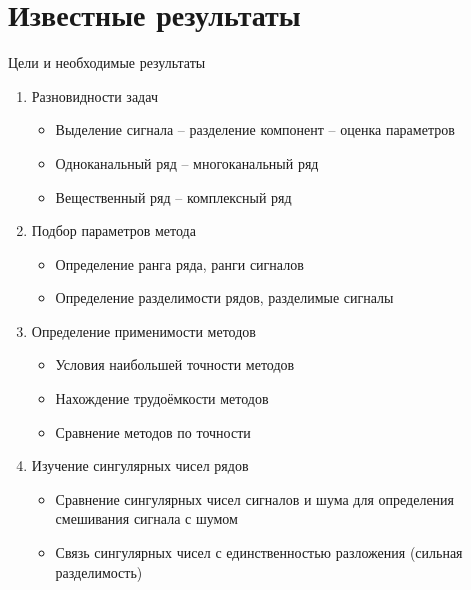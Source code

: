 \documentclass[pdf, unicode, 10pt, notheorems, handout]{beamer}
\begin{document}
\section{Известные результаты}
\begin{frame}{Цели и необходимые результаты}
  \begin{enumerate}
    \item Разновидности задач
      \begin{itemize}
        \item Выделение сигнала -- разделение компонент -- оценка параметров
        \item Одноканальный ряд -- многоканальный ряд
        \item Вещественный ряд -- комплексный ряд
      \end{itemize}\medskip
    \item Подбор параметров метода
      \begin{itemize}
        \item Определение ранга ряда, ранги сигналов
        \item Определение разделимости рядов, разделимые сигналы
      \end{itemize}\medskip
    \item Определение применимости методов
      \begin{itemize}
        \item Условия наибольшей точности методов
        \item Нахождение трудоёмкости методов
        \item Сравнение методов по точности
      \end{itemize}\medskip
    \item Изучение сингулярных чисел рядов
      \begin{itemize}
        \item Сравнение сингулярных чисел сигналов и шума для
          определения смешивания сигнала с шумом
        \item Связь сингулярных чисел с единственностью разложения
          (сильная разделимость)
      \end{itemize}
  \end{enumerate}
\end{frame}
\end{document}
